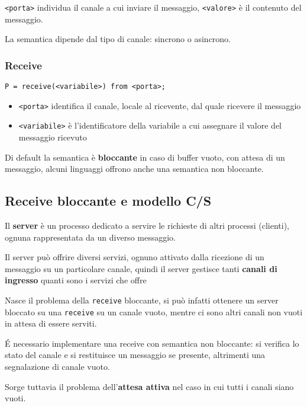 \texttt{<porta>} individua il canale a cui inviare il messaggio, \texttt{<valore>} è il contenuto del messaggio.

La semantica dipende dal tipo di canale: sincrono o asincrono.

\subsubsection{Receive}
\begin{verbatim}
P = receive(<variabile>) from <porta>;
\end{verbatim}

\begin{itemize}
    \item \texttt{<porta>} identifica il canale, locale al ricevente, dal quale ricevere il messaggio
    \item \texttt{<variabile>} è l'identificatore della variabile a cui assegnare il valore del messaggio ricevuto
\end{itemize}

Di default la semantica è \textbf{bloccante} in caso di buffer vuoto, con attesa di un messaggio, alcuni linguaggi offrono anche una semantica non bloccante.

\subsection{Receive bloccante e modello C/S}

Il \textbf{server} è un processo dedicato a servire le richieste di altri processi (clienti), ognuna rappresentata da un diverso messaggio.

Il server può offrire diversi servizi, ognuno attivato dalla ricezione di un messaggio su un particolare canale, quindi il server gestisce tanti \textbf{canali di ingresso} quanti sono i servizi che offre

Nasce il problema della \texttt{receive} bloccante, si può infatti ottenere un server bloccato su una \texttt{receive} su un canale vuoto, mentre ci sono altri canali non vuoti in attesa di essere serviti.

É necessario implementare una receive con semantica non bloccante: si verifica lo stato del canale e si restituisce un messaggio se presente, altrimenti una segnalazione di canale vuoto.

Sorge tuttavia il problema dell'\textbf{attesa attiva} nel caso in cui tutti i canali siano vuoti.


